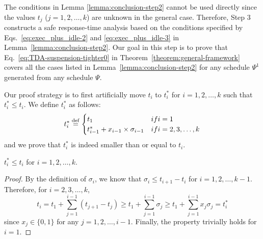 





The conditions in Lemma \ref{lemma:conclusion-step2}  cannot be used directly since the values $t_j$ ($j=1,2,\ldots,k$)
are unknown in the general case. %
Therefore, Step 3 constructs a safe response-time analysis based on the
conditions specified by Eqs.~\eqref{eq:exec_plus_idle-2} and
\eqref{eq:exec_plus_idle-3} in Lemma~\ref{lemma:conclusion-step2}. Our
goal in this step is to prove that Eq.~\eqref{eq:TDA-suspension-tighter0} in Theorem~\ref{theorem:general-framework} covers all the cases listed
in Lemma~\ref{lemma:conclusion-step2} for any schedule $\Psi^1$ generated from any schedule $\Psi$.

Our proof strategy is to first artificially move $t_i$ to $t_i^*$ for $i=1,2,\ldots,k$ such that $t_i^*
\leq t_i$. We define $t_i^*$ as follows:
\begin{equation}
\label{eq:ti*}
t_i^* \equals
\begin{cases}
t_1 & \mbox{if } i=1 \\
t_{i-1}^*+ x_{i-1}\times\sigma_{i-1} & \mbox{if } i=2,3,\ldots,k \\
\end{cases}
\end{equation}
and we prove that $t_i^*$ is indeed smaller than or equal to $t_i$.
\begin{Lemma}
\label{lemma:ti*}
$t_i^* \leq t_i$ for $i=1,2,\ldots,k$.
\end{Lemma}
\begin{proof}
By the definition of $\sigma_i$, we know that $\sigma_i \leq t_{i+1}-t_i$ for $i=1,2,\ldots,k-1$.
Therefore,  for $i=2,3,\ldots,k$,%
\begin{equation*}
  t_i = t_1 + \sum_{j=1}^{i-1} (t_{j+1} - t_j) \geq t_1 + \sum_{j=1}^{i-1} \sigma_j \geq t_1 + \sum_{j=1}^{i-1} x_j \sigma_j = t_i^*
\end{equation*}
since $x_j \in \{0, 1\}$ for any $j=1,2,\ldots,i-1$. 
Finally, the property trivially holds for $i=1$. 
\end{proof}

